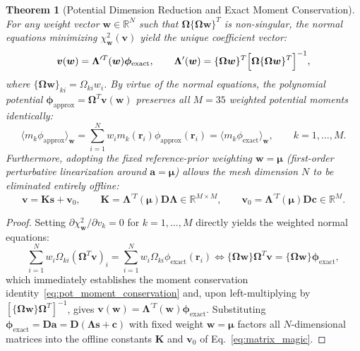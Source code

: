 \documentclass[11pt,a4paper]{article}
\newcommand{\bOmega}{\mathbf{\Omega}}
\newcommand{\bLambda}{\mathbf{\Lambda}}
\newtheorem{theorem}{Theorem}
\begin{document}
\begin{theorem}[Potential Dimension Reduction and Exact Moment Conservation]
\label{thm:potential_reduction}
For any weight vector $\bm{w} \in \mathbb{R}^N$ such that $\bOmega \{\bOmega\bm{w}\}^T$ is non-singular, the normal equations minimizing $\chi^2_{\bm{w}}(\bm{v})$ yield the unique coefficient vector:
\begin{equation}
    \bm{v}(\bm{w}) = \bLambda^{\prime T}(\bm{w}) \bm{\phi}_{\mathrm{exact}}, \qquad \bLambda^{\prime}(\bm{w}) = \{\bOmega\bm{w}\}^T \Bigl[ \bOmega \{\bOmega\bm{w}\}^T \Bigr]^{-1},
    \label{eq:lambda_prime_def}
\end{equation}
where $\{\bOmega\bm{w}\}_{ki} = \Omega_{ki} w_i$. By virtue of the normal equations, the polynomial potential $\bm{\phi}_{\mathrm{approx}} = \bOmega^T \bm{v}(\bm{w})$ preserves all $M=35$ weighted potential moments identically:
\begin{equation}
    \langle m_k \phi_{\mathrm{approx}} \rangle_{\bm{w}} = \sum_{i=1}^N w_i m_k(\bm{r}_i) \phi_{\mathrm{approx}}(\bm{r}_i) = \langle m_k \phi_{\mathrm{exact}} \rangle_{\bm{w}}, \qquad k = 1, \dots, M.
    \label{eq:pot_moment_conservation}
\end{equation}
Furthermore, adopting the fixed reference-prior weighting $\bm{w} = \bm{\mu}$ (first-order perturbative linearization around $\bm{a} = \bm{\mu}$) allows the mesh dimension $N$ to be eliminated entirely offline:
\begin{equation}
    \bm{v} = \bm{K} \bm{s} + \bm{v}_0, \qquad \bm{K} = \bLambda^{\prime T}(\bm{\mu}) \bm{D} \bLambda \in \mathbb{R}^{M \times M}, \qquad \bm{v}_0 = \bLambda^{\prime T}(\bm{\mu}) \bm{D} \bm{c} \in \mathbb{R}^M.
    \label{eq:matrix_magic}
\end{equation}
\end{theorem}

\begin{proof}
Setting $\partial \chi^2_{\bm{w}} / \partial v_k = 0$ for $k = 1, \dots, M$ directly yields the weighted normal equations:
\begin{equation}
    \sum_{i=1}^N w_i \Omega_{ki} \left( \bm{\Omega}^T \bm{v} \right)_i = \sum_{i=1}^N w_i \Omega_{ki} \phi_{\mathrm{exact}}(\bm{r}_i) \iff \{\bOmega\bm{w}\} \bOmega^T \bm{v} = \{\bOmega\bm{w}\} \bm{\phi}_{\mathrm{exact}},
    \label{eq:pot_normal}
\end{equation}
which immediately establishes the moment conservation identity~\eqref{eq:pot_moment_conservation} and, upon left-multiplying by $[\{\bOmega\bm{w}\}\bOmega^T]^{-1}$, gives $\bm{v}(\bm{w}) = \bLambda^{\prime T}(\bm{w})\bm{\phi}_{\mathrm{exact}}$. Substituting $\bm{\phi}_{\mathrm{exact}} = \bm{D}\bm{a} = \bm{D}(\bLambda\bm{s} + \bm{c})$ with fixed weight $\bm{w} = \bm{\mu}$ factors all $N$-dimensional matrices into the offline constants $\bm{K}$ and $\bm{v}_0$ of Eq.~\eqref{eq:matrix_magic}.
\end{proof}
\end{document}
